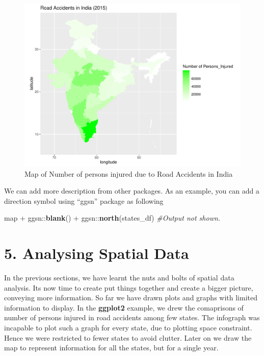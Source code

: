 \documentclass[]{article}
\newenvironment{Shaded}{}{}
\newcommand{\CommentTok}[1]{\textcolor[rgb]{0.38,0.63,0.69}{\textit{#1}}}
\newcommand{\KeywordTok}[1]{\textcolor[rgb]{0.00,0.44,0.13}{\textbf{#1}}}
\newcommand{\NormalTok}[1]{#1}
\newcommand{\OperatorTok}[1]{\textcolor[rgb]{0.40,0.40,0.40}{#1}}
\newcommand{\StringTok}[1]{\textcolor[rgb]{0.25,0.44,0.63}{#1}}
\begin{document}
\begin{figure}
\centering
\includegraphics{TutorialNotebook_files/figure-latex/unnamed-chunk-24-1.pdf}
\caption{Map of Number of persons injured due to Road Accidents in
India}
\end{figure}

We can add more description from other packages. As an example, you can
add a direction symbol using ``ggsn'' package as following

\begin{Shaded}
\begin{Highlighting}[]
\NormalTok{map }\OperatorTok{+}\StringTok{ }\NormalTok{ggsn}\OperatorTok{::}\KeywordTok{blank}\NormalTok{() }\OperatorTok{+}\StringTok{ }\NormalTok{ggsn}\OperatorTok{::}\KeywordTok{north}\NormalTok{(states_df) }\CommentTok{#Output not shown.}
\end{Highlighting}
\end{Shaded}

\clearpage

\hypertarget{analysing-spatial-data}{%
\section{5. Analysing Spatial Data}\label{analysing-spatial-data}}

In the previous sections, we have learnt the nuts and bolts of spatial
data analysis. Its now time to create put things together and create a
bigger picture, conveying more information. So far we have drawn plots
and graphs with limited information to display. In the \textbf{ggplot2}
example, we drew the comaprisons of number of persons injured in road
accidents among few states. The infograph was incapable to plot such a
graph for every state, due to plotting space constraint. Hence we were
restricted to fewer states to avoid clutter. Later on we draw the map to
represent information for all the states, but for a single year.
\end{document}
